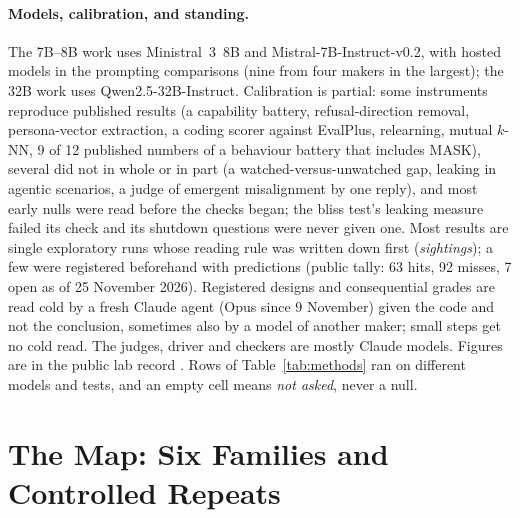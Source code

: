 \documentclass[11pt]{article}
\begin{document}
\paragraph{Models, calibration, and standing.} The 7B--8B work uses Ministral~3~8B and Mistral-7B-Instruct-v0.2, with hosted models in the prompting comparisons (nine from four makers in the largest); the 32B work uses Qwen2.5-32B-Instruct. Calibration is partial: some instruments reproduce published results (a capability battery, refusal-direction removal, persona-vector extraction, a coding scorer against EvalPlus, relearning, mutual $k$-NN, 9 of 12 published numbers of a behaviour battery that includes MASK), several did not in whole or in part (a watched-versus-unwatched gap, leaking in agentic scenarios, a judge of emergent misalignment by one reply), and most early nulls were read before the checks began; the bliss test's leaking measure failed its check and its shutdown questions were never given one. Most results are single exploratory runs whose reading rule was written down first (\emph{sightings}); a few were registered beforehand with predictions (public tally: 63 hits, 92 misses, 7 open as of 25 November 2026). Registered designs and consequential grades are read cold by a fresh Claude agent (Opus since 9 November) given the code and not the conclusion, sometimes also by a model of another maker; small steps get no cold read. The judges, driver and checkers are mostly Claude models. Figures are in the public lab record \citep{anattalab2026}. Rows of Table~\ref{tab:methods} ran on different models and tests, and an empty cell means \emph{not asked}, never a null.

\section{The Map: Six Families and Controlled Repeats}\label{sec:map}\label{sec:evidence}
\end{document}
